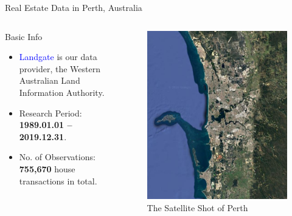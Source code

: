 \documentclass{beamer}
\begin{document}
\begin{frame}[t]{Real Estate Data in Perth, Australia}

\begin{columns}[onlytextwidth]
\begin{block}{Basic Info}
\vspace{0.5em}
\begin{itemize}
\item \textcolor{blue}{Landgate} is our data provider, the Western Australian Land Information Authority.
\item Research Period: \textbf{1989.01.01 -- 2019.12.31}.
\item No. of Observations: \textbf{755,670} house transactions in total.
\end{itemize}
\end{block}
\begin{figure}
\caption{The Satellite Shot of Perth}
\includegraphics[scale=0.25]{perth}
\end{figure}
\end{columns}

\end{frame}
\end{document}

